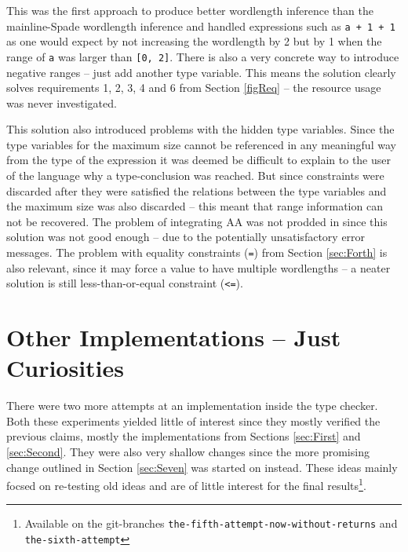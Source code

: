This was the first approach to produce better wordlength inference than the mainline-Spade wordlength inference and handled expressions such as \verb!a + 1 + 1! as one would expect by not increasing the wordlength by 2 but by 1 when the range of \verb+a+ was larger than \verb+[0, 2]+. There is also a very concrete way to introduce negative ranges -- just add another type variable. This means the solution clearly solves requirements 1, 2, 3, 4 and 6 from Section \ref{figReq} -- the resource usage was never investigated.

This solution also introduced problems with the hidden type variables. Since the type variables for the maximum size cannot be referenced in any meaningful way from the type of the expression it was deemed be difficult to explain to the user of the language why a type-conclusion was reached. But since constraints were discarded after they were satisfied the relations between the type variables and the maximum size was also discarded -- this meant that range information can not be recovered. The problem of integrating AA was not prodded in since this solution was not good enough -- due to the potentially unsatisfactory error messages. The problem with equality constraints (\verb+=+) from Section \ref{sec:Forth} is also relevant, since it may force a value to have multiple wordlengths -- a neater solution is still less-than-or-equal constraint (\verb+<=+).

\section{Other Implementations -- Just Curiosities}
\label{sec:Other}

There were two more attempts at an implementation inside the type checker. Both these experiments yielded little of interest since they mostly verified the previous claims, mostly the implementations from Sections \ref{sec:First} and \ref{sec:Second}. They were also very shallow changes since the more promising change outlined in Section \ref{sec:Seven} was started on instead. These ideas mainly focsed on re-testing old ideas and are of little interest for the final results\cprotect\footnote{Available on the git-branches \verb+the-fifth-attempt-now-without-returns+ and \verb+the-sixth-attempt+}.


